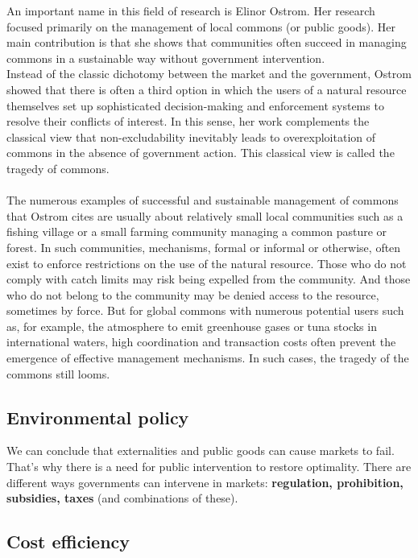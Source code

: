 \documentclass[../summary.tex]{subfiles}
\begin{document}
	  An important name in this field of research is Elinor Ostrom. Her research focused primarily on the management of local commons (or public goods). Her main contribution is that she shows that communities often succeed in managing commons in a sustainable way without government intervention.
	  \\
	  Instead of the classic dichotomy between the market and the government, Ostrom showed that there is often a third option in which the users of a natural resource themselves set up sophisticated decision-making and enforcement systems to resolve their conflicts of interest. In this sense, her work complements the classical view that non-excludability inevitably leads to overexploitation of commons in the absence of government action. This classical view is called the tragedy of commons. 
	  \\\\
	  The numerous examples of successful and sustainable management of commons that Ostrom cites are usually about relatively small local communities such as a fishing village or a small farming community managing a common pasture or forest. In such communities, mechanisms, formal or informal or otherwise, often exist to enforce restrictions on the use of the natural resource. Those who do not comply with catch limits may risk being expelled from the community. And those who do not belong to the community may be denied access to the resource, sometimes by force. But for global commons with numerous potential users such as, for example, the atmosphere to emit greenhouse gases or tuna stocks in international waters, high coordination and transaction costs often prevent the emergence of effective management mechanisms. In such cases, the tragedy of the commons still looms.
	  
	  \subsection{Environmental policy}
	  
	  We can conclude that externalities and public goods can cause markets to fail. That's why there is a need for public intervention to restore optimality. There are different ways governments can intervene in markets: \textbf{regulation, prohibition, subsidies, taxes} (and combinations of these).
	  
	  \subsection{Cost efficiency}
	    
\end{document}
